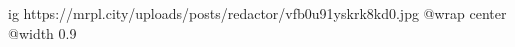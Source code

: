  
 
 
 
 

\ifcmt
  ig https://mrpl.city/uploads/posts/redactor/vfb0u91yskrk8kd0.jpg
  @wrap center
  @width 0.9
\fi

